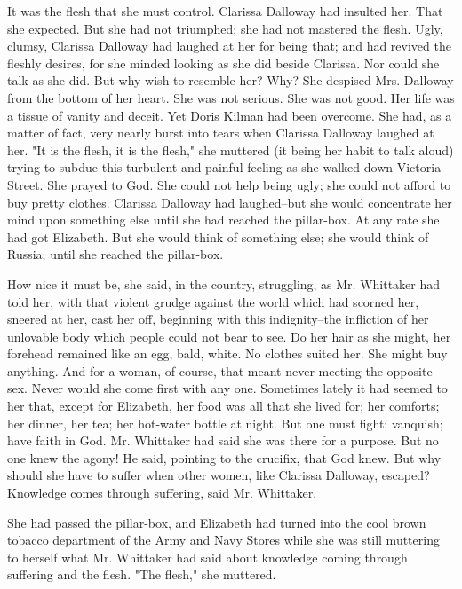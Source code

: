 \documentclass[lang=cn,10pt]{elegantbook}
\begin{document}
It was the flesh that she must control.  Clarissa Dalloway had
insulted her.  That she expected.  But she had not triumphed; she
had not mastered the flesh.  Ugly, clumsy, Clarissa Dalloway had
laughed at her for being that; and had revived the fleshly desires,
for she minded looking as she did beside Clarissa.  Nor could she
talk as she did.  But why wish to resemble her?  Why?  She despised
Mrs. Dalloway from the bottom of her heart.  She was not serious.
She was not good.  Her life was a tissue of vanity and deceit.  Yet
Doris Kilman had been overcome.  She had, as a matter of fact, very
nearly burst into tears when Clarissa Dalloway laughed at her.  "It
is the flesh, it is the flesh," she muttered (it being her habit to
talk aloud) trying to subdue this turbulent and painful feeling as
she walked down Victoria Street.  She prayed to God.  She could not
help being ugly; she could not afford to buy pretty clothes.
Clarissa Dalloway had laughed--but she would concentrate her mind
upon something else until she had reached the pillar-box.  At any
rate she had got Elizabeth.  But she would think of something else;
she would think of Russia; until she reached the pillar-box.

How nice it must be, she said, in the country, struggling, as Mr.
Whittaker had told her, with that violent grudge against the world
which had scorned her, sneered at her, cast her off, beginning with
this indignity--the infliction of her unlovable body which people
could not bear to see.  Do her hair as she might, her forehead
remained like an egg, bald, white.  No clothes suited her.  She
might buy anything.  And for a woman, of course, that meant never
meeting the opposite sex.  Never would she come first with any one.
Sometimes lately it had seemed to her that, except for Elizabeth,
her food was all that she lived for; her comforts; her dinner, her
tea; her hot-water bottle at night.  But one must fight; vanquish;
have faith in God.  Mr. Whittaker had said she was there for a
purpose.  But no one knew the agony!  He said, pointing to the
crucifix, that God knew.  But why should she have to suffer when
other women, like Clarissa Dalloway, escaped?  Knowledge comes
through suffering, said Mr. Whittaker.

She had passed the pillar-box, and Elizabeth had turned into the
cool brown tobacco department of the Army and Navy Stores while she
was still muttering to herself what Mr. Whittaker had said about
knowledge coming through suffering and the flesh.  "The flesh," she
muttered.
\end{document}
